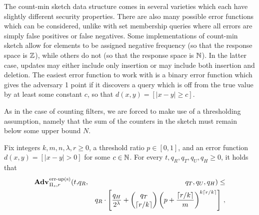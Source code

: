 

The count-min sketch data structure comes in several varieties which each have slightly different security properties. There are also many possible error functions which can be considered, unlike with set membership queries where all errors are simply false positives or false negatives. Some implementations of count-min sketch allow for elements to be assigned negative frequency (so that the response space is $\mathbb{Z}$), while others do not (so that the response space is $\mathbb{N}$). In the latter case, updates may either include only insertion or may include both insertion and deletion. The easiest error function to work with is a binary error function which gives the adversary 1 point if it discovers a query which is off from the true value by at least some constant $c$, so that $d(x,y) = [|x - y| \ge c]$.


As in the case of counting filters, we are forced to make use of a thresholding assumption, namely that the sum of the counters in the sketch must remain below some upper bound $N$.

\begin{theorem}\label{thm:count-ms-bound}
Fix integers $k, m, n, \lambda, r\geq 0$, a threshold ratio $p \in [0,1]$, and an error function $d(x,y) = [|x - y| > 0]$ for some $c \in \mathbb{N}$.
  For every $t, q_R, q_T, q_U, q_H \geq 0$, it holds that
  \begin{eqnarray*}
    \Adv{\erreps}_{\struct_s,r}(t,&q_R,& q_T, q_U, q_H) \leq \\ && q_R \cdot \left[\frac{q_H}{2^\lambda} + \binom{q_T}{\lceil r/k \rceil}\left(p+\frac{\lceil r/k \rceil}{m}\right)^{k\lceil r/k \rceil}\right] \,,
\end{eqnarray*}
\end{theorem}

